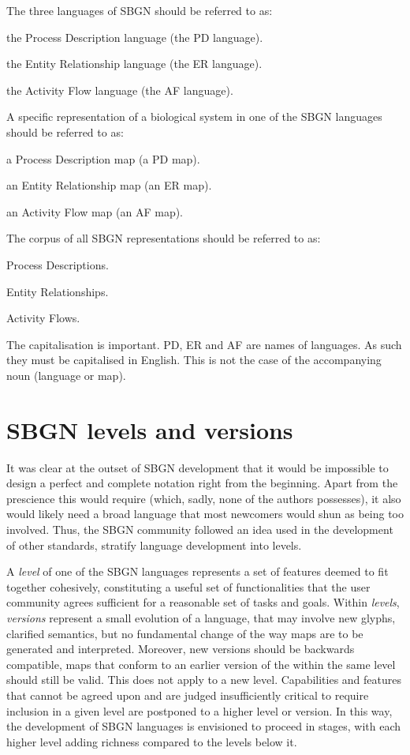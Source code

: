 The three languages of SBGN should be referred to as:
\begin{compactitem}
\item the Process Description language (the PD language).
\item the Entity Relationship language (the ER language).
\item the Activity Flow language  (the AF language).
\end{compactitem}
A specific representation of a biological system in one of the SBGN languages should be referred to as:
\begin{compactitem}
\item a Process Description map (a PD map).
\item an Entity Relationship map (an ER map).
\item an Activity Flow map (an AF map).
\end{compactitem}
The corpus of all SBGN representations should be referred to as:
\begin{compactitem}
\item Process Descriptions.
\item Entity Relationships.
\item Activity Flows.
\end{compactitem}
The capitalisation is important. PD, ER and AF are names of languages. 
As such they must be capitalised in English. This is not the case of the accompanying noun (language or map).

\section{SBGN levels and versions}
\label{sec:sbgn-levels}

It was clear at the outset of SBGN development that it would be impossible 
to design a perfect and complete notation right from the beginning.  Apart 
from the prescience this would require (which, sadly, none of the authors 
possesses), it also would likely need a broad language that most newcomers 
would shun as being too involved.  Thus, the SBGN community followed an idea 
used in the development of other standards, \ie stratify language 
development into levels.

A \emph{level} of one of the SBGN languages represents a set of features 
deemed to fit together cohesively, constituting a useful set of 
functionalities that the user community agrees sufficient for a reasonable 
set of tasks and goals. Within \emph{levels}, \emph{versions} represent 
a small evolution of a language, that may involve new glyphs, clarified 
semantics, but no fundamental change of the way maps are to be generated 
and interpreted. Moreover, new versions should be backwards compatible, 
\ie \PD maps that conform to an earlier version of the \PDl within 
the same level should still be valid. This does not apply to a new level.
Capabilities and features that cannot be agreed upon and 
are judged insufficiently critical to require inclusion in a given level 
are postponed to a higher level or version.  In this way, the development 
of SBGN languages is envisioned to proceed in stages, with each higher 
level adding richness compared to the levels below it.

